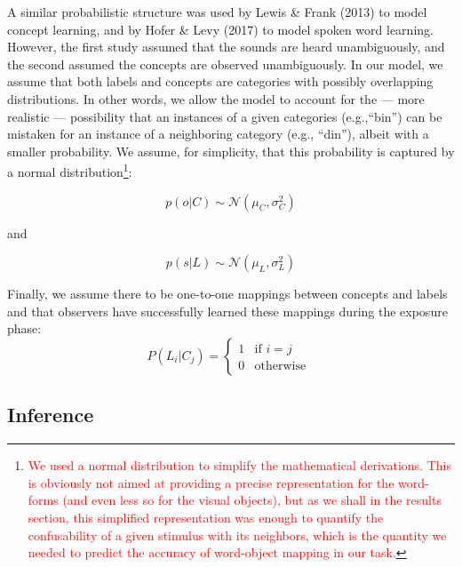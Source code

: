 \documentclass[english,,man]{apa6}
\let\rmarkdownfootnote\footnote%
\def\footnote{\protect\rmarkdownfootnote}
\begin{document}
A similar probabilistic structure was used by Lewis \& Frank (2013) to model concept learning, and by Hofer \& Levy (2017) to model spoken word learning. However, the first study assumed that the sounds are heard unambiguously, and the second assumed the concepts are observed unambiguously. In our model, we assume that both labels and concepts are categories with possibly overlapping distributions. In other words, we allow the model to account for the --- more realistic --- possibility that an instances of a given categories (e.g.,\enquote{bin}) can be mistaken for an instance of a neighboring category (e.g., \enquote{din}), albeit with a smaller probability. We assume, for simplicity, that this probability is captured by a normal distribution\footnote{\textcolor{red}{We used a normal distribution to simplify the mathematical derivations. This is obviously not aimed at providing a precise representation for the word-forms (and even less so for the visual objects), but as we shall in the results section, this simplified representation was enough to quantify the confusability of a given stimulus with its neighbors, which is the quantity we needed to predict the accuracy of word-object mapping in our task.}}:

\begin{equation} \label{eq:object}
 p(o | C) \sim  \mathcal{N}(\mu_C, \sigma^2_C) 
\end{equation}

\begin{center}
and 
\end{center}

\begin{equation} \label{eq:sound}
p(s| L) \sim  \mathcal{N}(\mu_L, \sigma^2_L)
\end{equation}

Finally, we assume there to be one-to-one mappings between concepts and labels and that observers have successfully learned these mappings during the exposure phase:
\begin{equation}\label{eq:mapping}
P(L_i|C_j) = 
\begin{cases}
  1 & \text{if  }  i=j \\  
  0  & \text{otherwise  }
\end{cases}
\end{equation}

\hypertarget{inference}{%
\subsection{Inference}\label{inference}}
\end{document}
